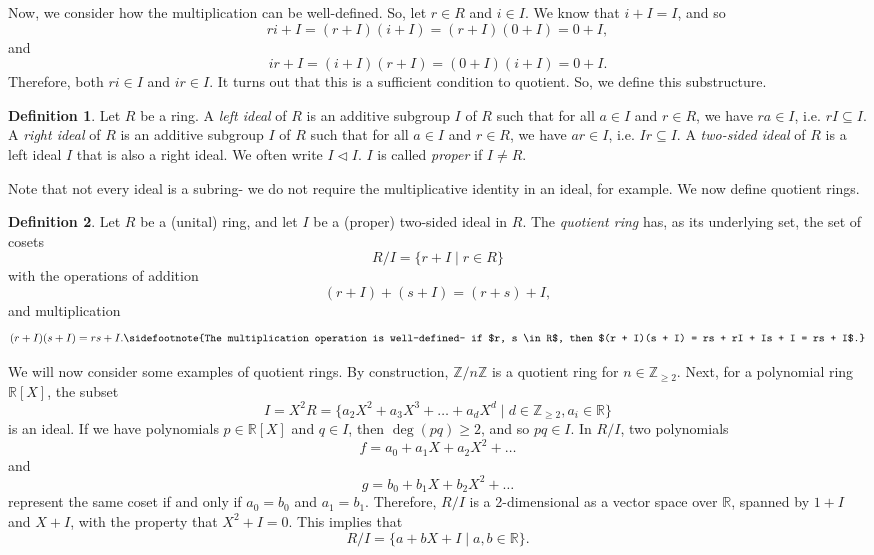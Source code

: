 \documentclass[a4paper, openany]{memoir}
\theoremstyle{definition}
\newtheorem{definition}{Definition}[section]
\theoremstyle{plain}
\begin{document}
Now, we consider how the multiplication can be well-defined. So, let $r \in R$ and $i \in I$. We know that $i + I = I$, and so
\[ri + I = (r + I)(i + I) = (r + I)(0 + I) = 0 + I,\]
and
\[ir + I = (i + I)(r + I) = (0 + I)(i + I) = 0 + I.\]
Therefore, both $ri \in I$ and $ir \in I$. It turns out that this is a sufficient condition to quotient. So, we define this substructure.
\begin{definition}
Let $R$ be a ring. A \emph{left ideal} of $R$ is an additive subgroup $I$ of $R$ such that for all $a \in I$ and $r \in R$, we have $ra \in I$, i.e. $rI \subseteq I$. A \emph{right ideal} of $R$ is an additive subgroup $I$ of $R$ such that for all $a \in I$ and $r \in R$, we have $ar \in I$, i.e. $Ir \subseteq I$. A \emph{two-sided ideal} of $R$ is a left ideal $I$ that is also a right ideal. We often write $I \vartriangleleft I$. $I$ is called \emph{proper} if $I \neq R$.
\end{definition}
\noindent Note that not every ideal is a subring- we do not require the multiplicative identity in an ideal, for example. We now define quotient rings.
\begin{definition}
Let $R$ be a (unital) ring, and let $I$ be a (proper) two-sided ideal in $R$. The \emph{quotient ring} has, as its underlying set, the set of cosets
\[R/I = \{r + I \mid r \in R\}\]
with the operations of addition
\[(r + I) + (s + I) = (r + s) + I,\]
and multiplication
\[(r + I)(s + I) = rs + I.\sidefootnote{The multiplication operation is well-defined- if $r, s \in R$, then $(r + I)(s + I) = rs + rI + Is + I = rs + I$.}\]
\end{definition}
We will now consider some examples of quotient rings. By construction, $\mathbb{Z}/n \mathbb{Z}$ is a quotient ring for $n \in \mathbb{Z}_{\geqslant 2}$. Next, for a polynomial ring $\mathbb{R}[X]$, the subset
\[I = X^2R = \{a_2X^2 + a_3X^3 + \dots + a_d X^d \mid d \in \mathbb{Z}_{\geqslant 2}, a_i \in \mathbb{R}\}\]
is an ideal. If we have polynomials $p \in \mathbb{R}[X]$ and $q \in I$, then $\deg(pq) \geq 2$, and so $pq \in I$. In $R/I$, two polynomials 
\[f = a_0 + a_1X + a_2X^2 + \dots \]
and
\[g = b_0 + b_1X + b_2X^2 + \dots \]
represent the same coset if and only if $a_0 = b_0$ and $a_1 = b_1$. Therefore, $R/I$ is a 2-dimensional as a vector space over $\mathbb{R}$, spanned by $1 + I$ and $X + I$, with the property that $X^2 + I = 0$. This implies that
\[R/I = \{a + bX + I \mid a, b \in \mathbb{R}\}.\]
\end{document}
